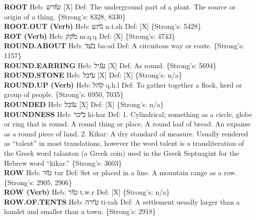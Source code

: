 {\textbf{ROOT} Heb: {\large\H שורש} {[}X{]} Def: The underground part of a plant. The source or origin of a thing. \{Strong's: 8328, 8330\}\hfill{}\\

\textbf{ROOT.OUT (Verb)} Heb: {\large\H נתש} n.t.sh Def: {[}X{]} \{Strong's: 5428\}\hfill{}\\

\textbf{ROT (Verb)} Heb: {\large\H מקק} m.q.q Def: {[}X{]} \{Strong's: 4743\}\hfill{}\\

\textbf{ROUND.ABOUT} Heb: {\large\H בעד} ba-ad Def: A circuitous way or route. \{Strong's: 1157\}\hfill{}\\

\textbf{ROUND.EARRING} Heb: {\large\H עגיל} {[}X{]} Def: As round. \{Strong's: 5694\}\hfill{}\\

\textbf{ROUND.STONE} Heb: {\large\H עיבל} {[}X{]} Def: {[}X{]} \{Strong's: n/a\}\hfill{}\\

\textbf{ROUND.UP (Verb)} Heb: {\large\H קהל} q.h.l Def: To gather together a flock, herd or group of people. \{Strong's: 6950, 7035\}\hfill{}\\

\textbf{ROUNDED} Heb: {\large\H עובל} {[}X{]} Def: {[}X{]} \{Strong's: n/a\}\hfill{}\\

\textbf{ROUNDNESS} Heb: {\large\H כיכר} ki-kar Def: 1. Cylindrical; something as a circle, globe or ring that is round. A round thing or place. A round loaf of bread. An expanse as a round piece of land. 2. Kikar: A dry standard of measure. Usually rendered as ``talent'' in most translations, however the word talent is a transliteration of the Greek word talanton (a Greek coin) used in the Greek Septuagint for the Hebrew word ``kikar.'' \{Strong's: 3603\}\hfill{}\\

\textbf{ROW} Heb: {\large\H טור} tur Def: Set or placed in a line. A mountain range as a row. \{Strong's: 2905, 2906\}\hfill{}\\

\textbf{ROW (Verb)} Heb: {\large\H טור} t.w.r Def: {[}X{]} \{Strong's: n/a\}\hfill{}\\

\textbf{ROW.OF.TENTS} Heb: {\large\H טירה} ti-rah Def: A settlement usually larger than a hamlet and smaller than a town. \{Strong's: 2918\}\hfill{}\\

}
